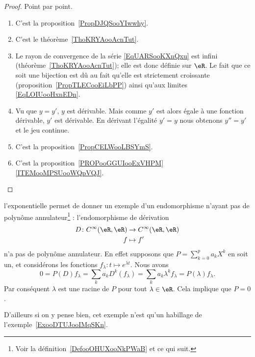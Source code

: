 \begin{proof}
    Point par point.
    \begin{enumerate}
        \item
            C'est la proposition~\ref{PropDJQSooYIwwhy}.
        \item
            C'est le théorème~\ref{ThoKRYAooAcnTut}.
        \item
            Le rayon de convergence de la série \eqref{EqUARSooKXnQxu} est infini (théorème~\ref{ThoKRYAooAcnTut}); elle est donc définie sur \( \eR\). Le fait que ce soit une bijection est dû au fait qu'elle est strictement croissante (proposition~\ref{PropTLECooEiLbPP}) ainsi qu'aux limites \eqref{EqLOIUooHxnEDn}.
        \item
            Vu que \( y=y'\), \( y\) est dérivable. Mais comme \( y'\) est alors égale à une fonction dérivable, \( y'\) est dérivable. En dérivant l'égalité \( y'=y\) nous obtenons \( y''=y'\) et le jeu continue.
        \item
            C'est la proposition~\ref{PropCELWooLBSYmS}.
        \item
            C'est la proposition~\ref{PROPooGGUIooExVHPM}\ref{ITEMooMPSUooWQpVQJ}.
    \end{enumerate}
\end{proof}

\begin{example}     \label{ExooLRHCooMYLQTU}
    l'exponentielle permet de donner un exemple d'un endomorphisme n'ayant pas de polynôme annulateur\footnote{Voir la définition~\ref{DefooOHUXooNkPWaB} et ce qui suit.} : l'endomorphisme de dérivation
    \begin{equation}
        \begin{aligned}
            D\colon C^{\infty}(\eR,\eR)&\to  C^{\infty}(\eR,\eR) \\
            f&\mapsto f'
        \end{aligned}
    \end{equation}
    n'a pas de polynôme annulateur. En effet supposons que \( P=\sum_{k=0}^{p}a_kX^k\) en soit un, et considérons les fonctions \( f_{\lambda}\colon t\mapsto  e^{\lambda t}\). Nous avons
    \begin{equation}
            0=P(D)f_{\lambda}
            =\sum_ka_kD^k(f_{\lambda})
            =\sum_ka_k\lambda^kf_{\lambda}
            =P(\lambda)f_{\lambda}.
    \end{equation}
    Par conséquent \( \lambda\) est une racine de \( P\) pour tout \( \lambda\in \eR\). Cela implique que \( P=0\).

    D'ailleurs si on y pense bien, cet exemple n'est qu'un habillage de l'exemple~\ref{ExooDTUJooIMqSKn}.
\end{example}


